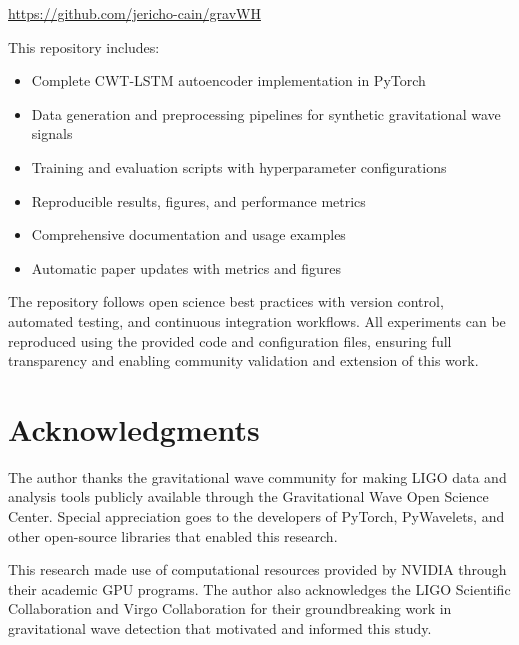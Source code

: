 \documentclass{iopjournal}
\begin{document}
\begin{center}
\url{https://github.com/jericho-cain/gravWH}
\end{center}

This repository includes:
\begin{itemize}
\item Complete CWT-LSTM autoencoder implementation in PyTorch
\item Data generation and preprocessing pipelines for synthetic gravitational wave signals
\item Training and evaluation scripts with hyperparameter configurations
\item Reproducible results, figures, and performance metrics
\item Comprehensive documentation and usage examples
\item Automatic paper updates with metrics and figures
\end{itemize}

The repository follows open science best practices with version control, automated testing, and continuous integration workflows. All experiments can be reproduced using the provided code and configuration files, ensuring full transparency and enabling community validation and extension of this work.

\section{Acknowledgments}

The author thanks the gravitational wave community for making LIGO data and analysis tools publicly available through the Gravitational Wave Open Science Center. Special appreciation goes to the developers of PyTorch, PyWavelets, and other open-source libraries that enabled this research.

This research made use of computational resources provided by NVIDIA through their academic GPU programs. The author also acknowledges the LIGO Scientific Collaboration and Virgo Collaboration for their groundbreaking work in gravitational wave detection that motivated and informed this study.



\end{document}
